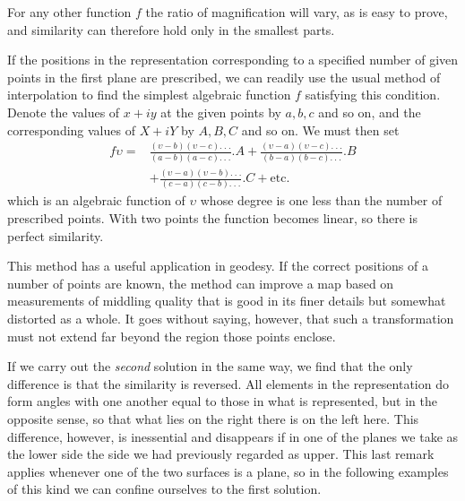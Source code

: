 For any other function \(f\) the ratio of magnification will vary, as is easy to prove, and similarity can therefore hold only in the smallest parts.

If the positions in the representation corresponding to a specified number of given points in the first plane are prescribed, we can readily use the usual method of interpolation to find the simplest algebraic function \(f\) satisfying this condition. Denote the values of \(x+iy\) at the given points by \(a,b,c\) and so on, and the corresponding values of \(X+iY\) by \(A,B,C\) and so on. We must then set
\[
\begin{aligned}
f\upsilon={}&\frac{(\upsilon-b)(\upsilon-c).\ .\ .}{(a-b)(a-c).\ .\ .}\mathord{.}A
+\frac{(\upsilon-a)(\upsilon-c).\ .\ .}{(b-a)(b-c).\ .\ .}\mathord{.}B\\
&+\frac{(\upsilon-a)(\upsilon-b).\ .\ .}{(c-a)(c-b).\ .\ .}\mathord{.}C+\text{etc.}
\end{aligned}
\]
\noindent which is an algebraic function of \(\upsilon\) whose degree is one less than the number of prescribed points. With two points the function becomes linear, so there is perfect similarity.

This method has a useful application in geodesy. If the correct positions of a number of points are known, the method can improve a map based on measurements of middling quality that is good in its finer details but somewhat distorted as a whole. It goes without saying, however, that such a transformation must not extend far beyond the region those points enclose.

If we carry out the \textit{second} solution in the same way, we find that the only difference is that the similarity is reversed. All elements in the representation do form angles with one another equal to those in what is represented, but in the opposite sense, so that
what lies on the right there is on the left here. This difference, however, is inessential and disappears if in one of the planes we take as the lower side the side we had previously regarded as upper. This last remark applies whenever one of the two surfaces is a plane, so in the following examples of this kind we can confine ourselves to the first solution.

